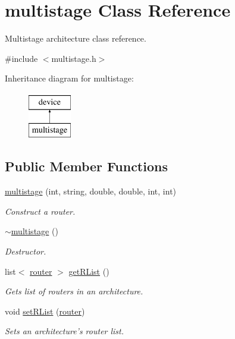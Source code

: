 \hypertarget{classmultistage}{
\section{multistage Class Reference}
\label{classmultistage}
}


Multistage architecture class reference.  




{\ttfamily \#include $<$multistage.h$>$}

Inheritance diagram for multistage:\begin{figure}[H]
\begin{center}
\leavevmode
\includegraphics[height=2.000000cm]{classmultistage}
\end{center}
\end{figure}
\subsection*{Public Member Functions}
\begin{DoxyCompactItemize}
\item 
\hyperlink{classmultistage_adcbb45a38e0184f037cdc03504dced05}{multistage} (int, string, double, double, int, int)
\begin{DoxyCompactList}\small\item\em Construct a router. \item\end{DoxyCompactList}\item 
\hyperlink{classmultistage_a3ce104e1cd528efc9f4f2b8b8c2f54a7}{$\sim$multistage} ()
\begin{DoxyCompactList}\small\item\em Destructor. \item\end{DoxyCompactList}\item 
list$<$ \hyperlink{classrouter}{router} $>$ \hyperlink{classmultistage_ad42d7006ba661c60eb4958f8534ad89a}{getRList} ()
\begin{DoxyCompactList}\small\item\em Gets list of routers in an architecture. \item\end{DoxyCompactList}\item 
void \hyperlink{classmultistage_a6f79ee151acaff9a49e06a3300371a2c}{setRList} (\hyperlink{classrouter}{router})
\begin{DoxyCompactList}\small\item\em Sets an architecture's router list. \item\end{DoxyCompactList}\end{DoxyCompactItemize}


